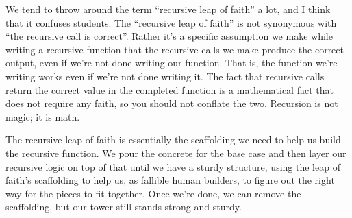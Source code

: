 \begin{meta}
\begin{enumerate}
\begin{itemize}
		\end{itemize}
\end{enumerate}
We tend to throw around the term ``recursive leap of faith'' a lot, and I think that it confuses students. The ``recursive leap of faith'' is not synonymous with ``the recursive call is correct''. Rather it's a specific assumption we make while writing a recursive function that the recursive calls we make produce the correct output, even if we're not done writing our function. That is, the function we're writing works even if we're not done writing it. The fact that recursive calls return the correct value in the completed function is a mathematical fact that does not require any faith, so you should not conflate the two. Recursion is not magic; it is math.

The recursive leap of faith is essentially the scaffolding we need to help us build the recursive function. We pour the concrete for the base case and then layer our recursive logic on top of that until we have a sturdy structure, using the leap of faith's scaffolding to help us, as fallible human builders, to figure out the right way for the pieces to fit together. Once we're done, we can remove the scaffolding, but our tower still stands strong and sturdy. 


\end{meta}
